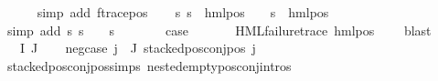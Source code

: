 \begin{isabellebody}
\ \ \ \ \isamarkupfalse%
\ {\isacharparenleft}{\kern0pt}simp\ add{\isacharcolon}{\kern0pt}\ f{\isacharunderscore}{\kern0pt}trace{\isacharunderscore}{\kern0pt}pos{\isacharparenright}{\kern0pt}\isanewline
\ \ \isamarkupfalse%
\ {\isachardoublequoteopen}{\isacharparenleft}{\kern0pt}{\isasymforall}s{\isachardot}{\kern0pt}\ {\isacharparenleft}{\kern0pt}s\ {\isasymTurnstile}\ hml{\isacharunderscore}{\kern0pt}pos\ {\isasymalpha}\ {\isasymphi}{\isacharparenright}{\kern0pt}\ {\isacharequal}{\kern0pt}\ {\isacharparenleft}{\kern0pt}s\ {\isasymTurnstile}\ {\isacharparenleft}{\kern0pt}hml{\isacharunderscore}{\kern0pt}pos\ {\isasymalpha}\ {\isasympsi}{\isacharparenright}{\kern0pt}{\isacharparenright}{\kern0pt}{\isacharparenright}{\kern0pt}{\isachardoublequoteclose}\ \isanewline
\ \ \ \ \isamarkupfalse%
\ {\isacharparenleft}{\kern0pt}simp\ add{\isacharcolon}{\kern0pt}\ {\isacartoucheopen}{\isasymforall}s{\isachardot}{\kern0pt}\ {\isacharparenleft}{\kern0pt}s\ {\isasymTurnstile}\ {\isasymphi}{\isacharparenright}{\kern0pt}\ {\isacharequal}{\kern0pt}\ {\isacharparenleft}{\kern0pt}s\ {\isasymTurnstile}\ {\isasympsi}{\isacharparenright}{\kern0pt}{\isacartoucheclose}{\isacharparenright}{\kern0pt}\isanewline
\ \ \isamarkupfalse%
\ \isamarkupfalse%
\ {\isacharquery}{\kern0pt}case\ \isanewline
\ \ \ \ \isamarkupfalse%
\ {\isacartoucheopen}HML{\isacharunderscore}{\kern0pt}failure{\isacharunderscore}{\kern0pt}trace\ {\isacharparenleft}{\kern0pt}hml{\isacharunderscore}{\kern0pt}pos\ {\isasymalpha}\ {\isasympsi}{\isacharparenright}{\kern0pt}{\isacartoucheclose}\ \isamarkupfalse%
\ blast\isanewline
{}\isamarkupfalse%
\isanewline
\ \ \isamarkupfalse%
\ {\isacharparenleft}{\kern0pt}{}\ {\isasymPhi}\ I\ J{\isacharparenright}{\kern0pt}\isanewline
\ \ \isamarkupfalse%
\ neg{\isacharunderscore}{\kern0pt}case{\isacharcolon}{\kern0pt}\ {\isachardoublequoteopen}{\isasymforall}j{\isasymin}{\isasymPhi}\ {\isacharbackquote}{\kern0pt}\ J{\isachardot}{\kern0pt}\ stacked{\isacharunderscore}{\kern0pt}pos{\isacharunderscore}{\kern0pt}conj{\isacharunderscore}{\kern0pt}pos\ j{\isachardoublequoteclose}\ \isanewline
\ \ \ \ \isamarkupfalse%
\ stacked{\isacharunderscore}{\kern0pt}pos{\isacharunderscore}{\kern0pt}conj{\isacharunderscore}{\kern0pt}pos{\isachardot}{\kern0pt}simps\ nested{\isacharunderscore}{\kern0pt}empty{\isacharunderscore}{\kern0pt}pos{\isacharunderscore}{\kern0pt}conj{\isachardot}{\kern0pt}intros{\isacharparenleft}{\kern0pt}{}{\isacharparenright}{\kern0pt}\ \isamarkupfalse%

\end{isabellebody}
